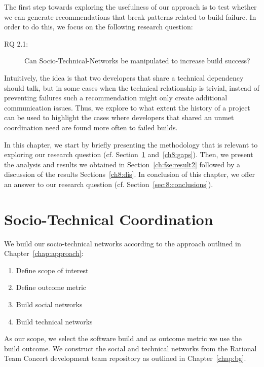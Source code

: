 \label{chap:stc-net}
\vspace{-6pt}
The first step towards exploring the usefulness of our approach is to test whether we can generate recommendations that break patterns related to build failure.
In order to do this, we focus on the following research question:

\begin{description}
  \item[RQ 2.1:] Can Socio-Technical-Networks be manipulated to increase build success? 
\end{description}

Intuitively, the idea is that two developers that share a technical dependency should talk, but in some cases when the technical relationship is trivial, instead of preventing failures such a recommendation might only create additional communication issues.
Thus, we explore to what extent the history of a project can be used to highlight the cases where developers that shared an unmet coordination need are found more often to failed builds.

In this chapter, we start by briefly presenting the methodology that is relevant to exploring our research question (cf. Section~\ref{sec:data} and~\ref{ch8:gaps}).
Then, we present the analysis and results we obtained in Section~\ref{ch:fse:result2} followed by a discussion of the results Sections~\ref{ch8:dis}.
In conclusion of this chapter, we offer an answer to our research question (cf. Section~\ref{sec:8:conclusions}).

\vspace{-5pt}
\section{Socio-Technical Coordination}
\label{sec:data}
We build our socio-technical networks according to the approach outlined in Chapter~\ref{chap:approach}:

\begin{enumerate}
\item Define scope of interest
\item Define outcome metric
\item Build social networks
\item Build technical networks
\end{enumerate}

As our scope, we select the software build and as outcome metric we use the build outcome.
We construct the social and technical networks from the Rational Team Concert development team repository as outlined in Chapter~\ref{chap:bg}.



